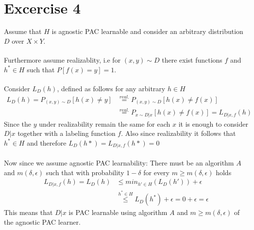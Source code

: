 \documentclass[12pt]{article}
\begin{document}
\section*{Excercise 4}
Assume that $H$ is agnostic PAC learnable and consider an arbitrary distribution $D$ over $X \times Y$. \\\\
Furthermore assume realizablity, i.e for $(x,y) \sim D$ there exist functions $f$ and $h^* \in H$ such that $P[f(x) = y] = 1 $. \\\\
Consider $L_D(h)$, defined as follows for any arbitrary $h \in H$
\begin{align*}
	L_D(h) = P_{(x,y) \sim D}[h(x) \neq y] &\overset{real.}{=}  P_{(x,y) \sim D}[h(x) \neq f(x)] \\
	&\overset{real.}{=}  P_{x \sim D|x}[h(x) \neq f(x)]  = L_{D|x,f}(h)
\end{align*}
Since the $y$ under realizability remain the same for each $x$ it is enough to consider $D|x$ together with a labeling function $f$. Also since realizability it follows that $h^* \in H$ and therefore $L_D(h*) = L_{D|x,f}(h*) = 0$\\\\
Now since we assume agnostic PAC learnability: There must be an algorithm $A$ and $m(\delta,\epsilon)$ such that with probability $1-\delta$ for every $m \geq m(\delta,\epsilon)$ holds 
\begin{align*}
	L_{D|x,f}(h)= L_D(h) &\leq min_{h' \in H}(L_D(h')) + \epsilon \\
	&\overset{h^* \in H}{\leq}  L_D(h^*) + \epsilon = 0 + \epsilon =  \epsilon
\end{align*}
This means that $D|x$ is PAC learnable using algorithm $A$ and $m\geq m(\delta,\epsilon)$ of the agnostic PAC learner.
\end{document}
